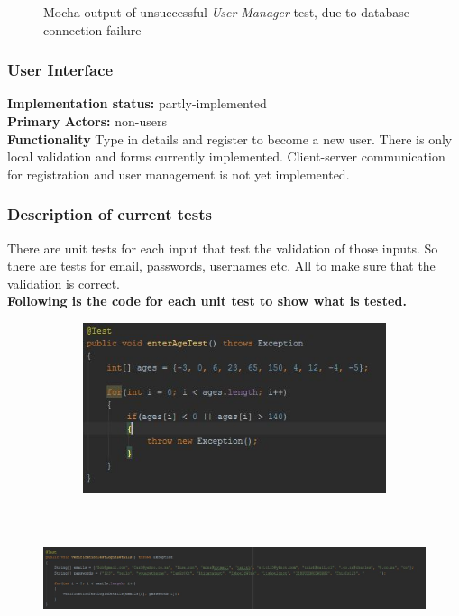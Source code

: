 \documentclass[12pt]{article}
\begin{document}
{\begin{center}
\begin{figure}[h!]
		\caption{Mocha output of unsuccessful \textit{User Manager} test, due to database connection failure}
	\end{figure}
	\end{center}

\pagebreak

	\subsubsection{User Interface}
	\textbf{Implementation status:} partly-implemented \\
	\textbf{Primary Actors:} non-users \\
	\textbf{Functionality} Type in details and register to become a new user. There is only local validation and forms currently implemented. Client-server communication for registration and user management is not yet implemented.
	\subsubsection{Description of current tests}
	There are unit tests for each input that test the validation of those inputs. So there are tests for email, passwords, usernames etc. All to make sure that the validation is correct. \\
	\textbf{Following is the code for each unit test to show what is tested.}
	\begin{center}
	\begin{figure}[h]
		\includegraphics[width=15cm, height=5cm]{tests/usrUI/TestAge.JPG}
	\end{figure}

	\begin{figure}[h]
		\includegraphics[width=15cm, height=4cm]{tests/usrUI/TestLogin.JPG}
	\end{figure}


\end{center}}
\end{document}
